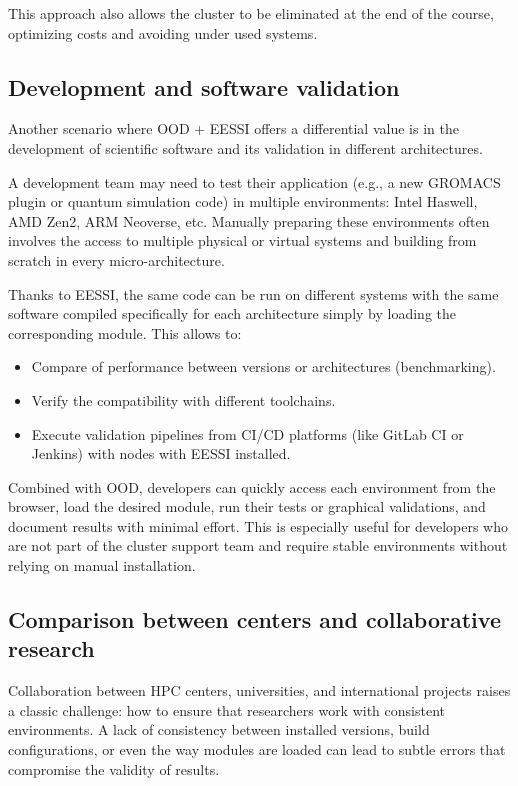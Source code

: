 \documentclass[11pt,a4paper]{article}
\begin{document}
This approach also allows the cluster to be eliminated at the end of the course, optimizing costs and avoiding under used systems.

\subsection{Development and software validation}

Another scenario where OOD + EESSI offers a differential value is in the development of scientific software and its validation in different architectures.

A development team may need to test their application (e.g., a new GROMACS plugin or quantum simulation code) in multiple environments: Intel Haswell, AMD Zen2, ARM Neoverse, etc. Manually preparing these environments often involves the access to multiple physical or virtual systems and building from scratch in every micro-architecture.

Thanks to EESSI, the same code can be run on different systems with the same software compiled specifically for each architecture simply by loading the corresponding module. This allows to:

\begin{itemize}
    \item Compare of performance between versions or architectures (benchmarking).
    \item Verify the compatibility with different toolchains.
    \item Execute validation pipelines from CI/CD platforms (like GitLab CI or Jenkins) with nodes with EESSI installed.
\end{itemize}

Combined with OOD, developers can quickly access each environment from the browser, load the desired module, run their tests or graphical validations, and document results with minimal effort. This is especially useful for developers who are not part of the cluster support team and require stable environments without relying on manual installation.

\subsection{Comparison between centers and collaborative research}

Collaboration between HPC centers, universities, and international projects raises a classic challenge: how to ensure that researchers work with consistent environments. A lack of consistency between installed versions, build configurations, or even the way modules are loaded can lead to subtle errors that compromise the validity of results.
\end{document}
